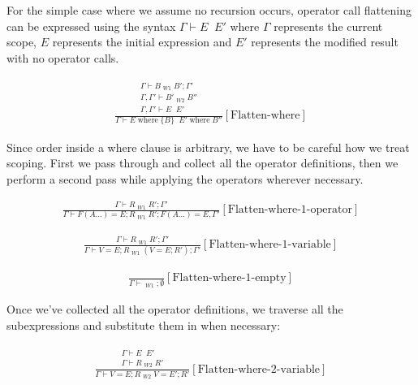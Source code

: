 \documentclass{scrartcl}
\DeclareMathOperator{\where}{where}
\DeclareMathOperator{\flattenrel}{\overset{flatten}{\Rightarrow}}
\begin{document}
    For the simple case where we assume no recursion occurs, operator call flattening can be expressed using the syntax $\Gamma \vdash E \flattenrel E'$ where $\Gamma$ represents the current scope, $E$ represents the initial expression and $E'$ represents the modified result with no operator calls.
    
    \begin{align*}
    \frac{
        \begin{matrix}
        \Gamma \vdash B \flattenrel_{W1} B'; \Gamma' \\
        \Gamma, \Gamma' \vdash B' \flattenrel_{W2} B'' \\
        \Gamma, \Gamma' \vdash E \flattenrel E'
        \end{matrix}
    }{
        \Gamma \vdash E \where \{ B \} \flattenrel E' \where B''
    }[\text{Flatten-where}]
    \end{align*}
    
    Since order inside a where clause is arbitrary, we have to be careful how we treat scoping. First we pass through and collect all the operator definitions, then we perform a second pass while applying the operators wherever necessary.
    
    \begin{align*}
    \frac{
        \Gamma \vdash R \flattenrel_{W1} R'; \Gamma'
    }{
        \Gamma \vdash F(A...) = E; R \flattenrel_{W1} R'; F(A...) = E, \Gamma'
    }[\text{Flatten-where-1-operator}]
    \end{align*}
    
    \begin{align*}
    \frac{
        \Gamma \vdash R \flattenrel_{W1} R'; \Gamma'
    }{
        \Gamma \vdash V = E; R \flattenrel_{W1} (V = E; R'); \Gamma'
    }[\text{Flatten-where-1-variable}]
    \end{align*}
    
    \begin{align*}
    \frac{}{
        \Gamma \vdash \flattenrel_{W1} ; \emptyset
    }[\text{Flatten-where-1-empty}]
    \end{align*}
    
    Once we've collected all the operator definitions, we traverse all the subexpressions and substitute them in when necessary:
    
    \begin{align*}
    \frac{
        \begin{matrix}
        \Gamma \vdash E \flattenrel E' \\
        \Gamma \vdash R \flattenrel_{W2} R'
        \end{matrix}
    }{
        \Gamma \vdash V = E; R \flattenrel_{W2} V = E'; R'
    }[\text{Flatten-where-2-variable}]
    \end{align*}
    
\end{document}
